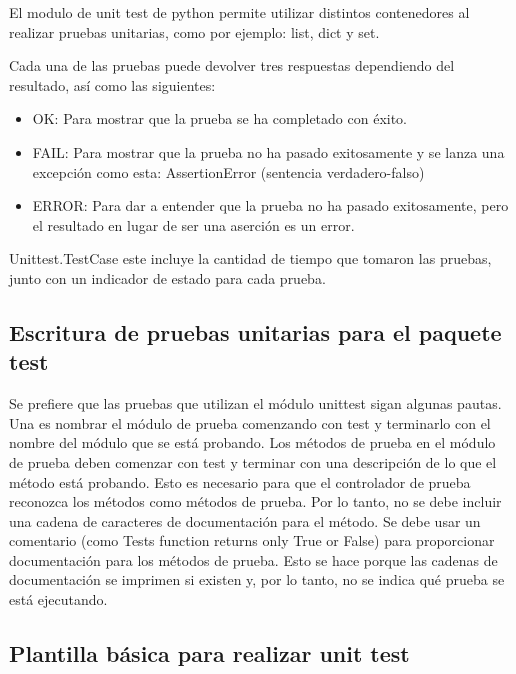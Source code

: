 \documentclass[conference]{IEEEtran}
\begin{document}
El modulo de unit test de python permite utilizar distintos contenedores al realizar pruebas unitarias, como por ejemplo: list, dict y set.

Cada una de las pruebas puede devolver tres respuestas dependiendo del resultado, así como las siguientes:

\begin{itemize}
\item OK: Para mostrar que la prueba se ha completado con éxito.
\item FAIL: Para mostrar que la prueba no ha pasado exitosamente y se lanza una excepción como esta: AssertionError (sentencia verdadero-falso)
\item ERROR: Para dar a entender que la prueba no ha pasado exitosamente, pero el resultado en lugar de ser una aserción es un error.
\end{itemize}

Unittest.TestCase este incluye la cantidad de tiempo que tomaron las pruebas, junto con un indicador de estado para cada prueba. 

\subsection{Escritura de pruebas unitarias para el paquete test}

Se prefiere que las pruebas que utilizan el módulo unittest sigan algunas pautas. Una es nombrar el módulo de prueba comenzando con test y terminarlo con el nombre del módulo que se está probando. Los métodos de prueba en el módulo de prueba deben comenzar con test y terminar con una descripción de lo que el método está probando. Esto es necesario para que el controlador de prueba reconozca los métodos como métodos de prueba. Por lo tanto, no se debe incluir una cadena de caracteres de documentación para el método. Se debe usar un comentario (como Tests function returns only True or False) para proporcionar documentación para los métodos de prueba. Esto se hace porque las cadenas de documentación se imprimen si existen y, por lo tanto, no se indica qué prueba se está ejecutando.

\subsection{Plantilla básica para realizar unit test}
\end{document}
